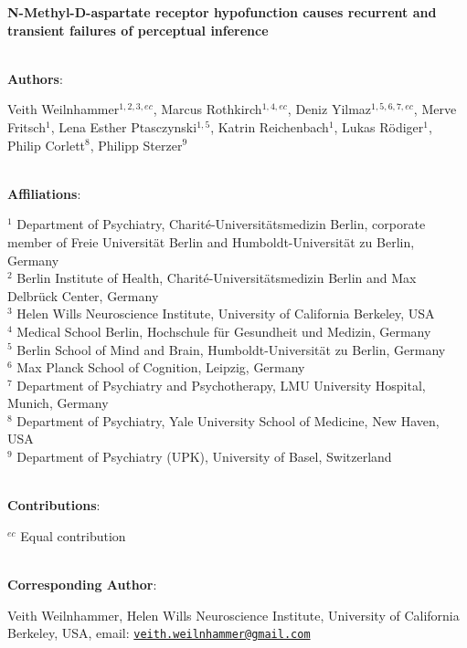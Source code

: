 \documentclass[
]{article}
\author{}
\date{\vspace{-2.5em}}
\begin{document}
\textbf{N-Methyl-D-aspartate receptor hypofunction causes recurrent and
transient failures of perceptual inference}\\
\strut \\

\textbf{Authors}:

Veith Weilnhammer\(^{1,2, 3,ec}\), Marcus Rothkirch\(^{1, 4, ec}\),
Deniz Yilmaz\(^{1,5,6,7, ec}\), Merve Fritsch\(^{1}\), Lena Esther
Ptasczynski\(^{1,5}\), Katrin Reichenbach\(^{1}\), Lukas
Rödiger\(^{1}\), Philip Corlett\(^{8}\), Philipp Sterzer\(^{9}\)\\
\strut \\
\textbf{Affiliations}:

\(^{1}\) Department of Psychiatry, Charité-Universitätsmedizin Berlin,
corporate member of Freie Universität Berlin and Humboldt-Universität zu
Berlin, Germany\\
\(^{2}\) Berlin Institute of Health, Charité-Universitätsmedizin Berlin
and Max Delbrück Center, Germany\\
\(^{3}\) Helen Wills Neuroscience Institute, University of California
Berkeley, USA\\
\(^{4}\) Medical School Berlin, Hochschule für Gesundheit und Medizin,
Germany\\
\(^{5}\) Berlin School of Mind and Brain, Humboldt-Universität zu
Berlin, Germany\\
\(^{6}\) Max Planck School of Cognition, Leipzig, Germany\\
\(^{7}\) Department of Psychiatry and Psychotherapy, LMU University
Hospital, Munich, Germany\\
\(^{8}\) Department of Psychiatry, Yale University School of Medicine,
New Haven, USA\\
\(^{9}\) Department of Psychiatry (UPK), University of Basel,
Switzerland\\
\strut \\
\textbf{Contributions}:

\(^{ec}\) Equal contribution\\
\strut \\
\textbf{Corresponding Author}:

Veith Weilnhammer, Helen Wills Neuroscience Institute, University of
California Berkeley, USA, email:
\href{mailto:veith.weilnhammer@gmail.com}{\nolinkurl{veith.weilnhammer@gmail.com}}\\

\newpage

\linenumbers
\end{document}
